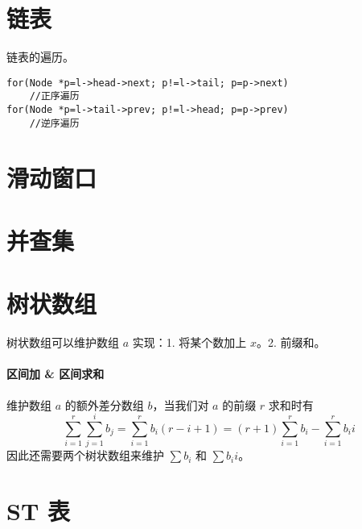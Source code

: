 \documentclass{probook}
\begin{document}
\begin{multicols}{2}
\section{链表}



链表的遍历。

\begin{lstlisting}[style=cpp]
for(Node *p=l->head->next; p!=l->tail; p=p->next)
	//正序遍历
for(Node *p=l->tail->prev; p!=l->head; p=p->prev)
	//逆序遍历
\end{lstlisting}

\section{滑动窗口}



\section{并查集}



\section{树状数组}

树状数组可以维护数组 $a$ 实现：1. 将某个数加上 $x$。2. 前缀和。



\paragraph{区间加 \& 区间求和}

维护数组 $a$ 的额外差分数组 $b$，当我们对 $a$ 的前缀 $r$ 求和时有
\[ \sum_{i=1}^r \sum_{j=1}^i b_j = \sum_{i=1}^rb_i(r-i+1) = (r+1)\sum_{i=1}^rb_i - \sum_{i=1}^rb_ii \]
因此还需要两个树状数组来维护 $\sum b_i$ 和 $\sum b_ii$。



\section{ST 表}


\end{multicols}
\end{document}
